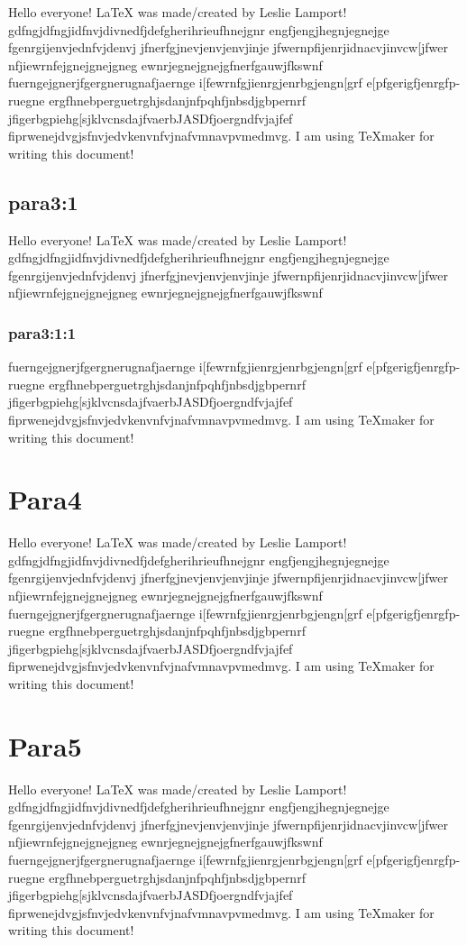 \documentclass[10pt,a4paper]{article}
\begin{document}
Hello everyone! LaTeX was made/created by Leslie Lamport! gdfngjdfngjidfnvjdivnedfjdefgherihrieufhnejgnr engfjengjhegnjegnejge fgenrgijenvjednfvjdenvj jfnerfgjnevjenvjenvjinje jfwernpfijenrjidnacvjinvcw[jfwer nfjiewrnfejgnejgnejgneg ewnrjegnejgnejgfnerfgauwjfkswnf fuerngejgnerjfgergnerugnafjaernge i[fewrnfgjienrgjenrbgjengn[grf e[pfgerigfjenrgfp-ruegne ergfhnebperguetrghjsdanjnfpqhfjnbsdjgbpernrf jfigerbgpiehg[sjklvcnsdajfvaerbJASDfjoergndfvjajfef fiprwenejdvgjsfnvjedvkenvnfvjnafvmnavpvmedmvg. 
I am using TeXmaker for writing this document!\\

\subsection{para3:1}
Hello everyone! LaTeX was made/created by Leslie Lamport! gdfngjdfngjidfnvjdivnedfjdefgherihrieufhnejgnr engfjengjhegnjegnejge fgenrgijenvjednfvjdenvj jfnerfgjnevjenvjenvjinje jfwernpfijenrjidnacvjinvcw[jfwer nfjiewrnfejgnejgnejgneg ewnrjegnejgnejgfnerfgauwjfkswnf

\subsubsection{para3:1:1} 
fuerngejgnerjfgergnerugnafjaernge i[fewrnfgjienrgjenrbgjengn[grf e[pfgerigfjenrgfp-ruegne ergfhnebperguetrghjsdanjnfpqhfjnbsdjgbpernrf jfigerbgpiehg[sjklvcnsdajfvaerbJASDfjoergndfvjajfef fiprwenejdvgjsfnvjedvkenvnfvjnafvmnavpvmedmvg. 
I am using TeXmaker for writing this document!\\

\section{Para4}
Hello everyone! LaTeX was made/created by Leslie Lamport! gdfngjdfngjidfnvjdivnedfjdefgherihrieufhnejgnr engfjengjhegnjegnejge fgenrgijenvjednfvjdenvj jfnerfgjnevjenvjenvjinje jfwernpfijenrjidnacvjinvcw[jfwer nfjiewrnfejgnejgnejgneg ewnrjegnejgnejgfnerfgauwjfkswnf fuerngejgnerjfgergnerugnafjaernge i[fewrnfgjienrgjenrbgjengn[grf e[pfgerigfjenrgfp-ruegne ergfhnebperguetrghjsdanjnfpqhfjnbsdjgbpernrf jfigerbgpiehg[sjklvcnsdajfvaerbJASDfjoergndfvjajfef fiprwenejdvgjsfnvjedvkenvnfvjnafvmnavpvmedmvg. 
I am using TeXmaker for writing this document!\\

\section{Para5}
Hello everyone! LaTeX was made/created by Leslie Lamport! gdfngjdfngjidfnvjdivnedfjdefgherihrieufhnejgnr engfjengjhegnjegnejge fgenrgijenvjednfvjdenvj jfnerfgjnevjenvjenvjinje jfwernpfijenrjidnacvjinvcw[jfwer nfjiewrnfejgnejgnejgneg ewnrjegnejgnejgfnerfgauwjfkswnf fuerngejgnerjfgergnerugnafjaernge i[fewrnfgjienrgjenrbgjengn[grf e[pfgerigfjenrgfp-ruegne ergfhnebperguetrghjsdanjnfpqhfjnbsdjgbpernrf jfigerbgpiehg[sjklvcnsdajfvaerbJASDfjoergndfvjajfef fiprwenejdvgjsfnvjedvkenvnfvjnafvmnavpvmedmvg. 
I am using TeXmaker for writing this document!\\
\end{document}
